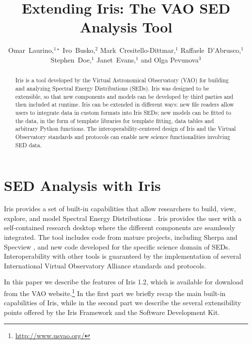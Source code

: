 \documentclass[11pt,twoside]{article}
\begin{document}
\title{Extending Iris: The VAO SED Analysis Tool}
\author{Omar~Laurino,$^{1\star}$ Ivo~Busko,$^2$ Mark~Cresitello-Dittmar,$^1$ Raffaele~D'Abrusco,$^1$ Stephen~Doe,$^1$ Janet~Evans,$^1$ and Olga Pevunova$^3$
}

\begin{abstract}
Iris is a tool developed by the Virtual Astronomical Observatory (VAO) for building and analyzing Spectral Energy Distributions (SEDs). Iris was designed to be extensible, so that new components and models can be developed by third parties and then included at runtime. Iris can be extended in different ways: new file readers allow users to integrate data in custom formats into Iris SEDs; new models can be fitted to the data, in the form of template libraries for template fitting, data tables and arbitrary Python functions. The interoperability-centered design of Iris and the Virtual Observatory standards and protocols can enable new science functionalities involving SED data.
\end{abstract}

\section{SED Analysis with Iris}
Iris provides a set of built-in capabilities that allow researchers to build, view, explore, and model Spectral Energy Distributions \citep[SEDs;][]{2012ASPC..461..893D}. Iris provides the user with a self-contained research desktop where the different components are seamlessly integrated. The tool includes code from mature projects, including Sherpa \citep{2007ASPC..376..543D} and Specview \citep{2000ASPC..216...79B}, and new code developed for the specific science domain of SEDs.
Interoperability with other tools is guaranteed by the implementation of several International Virtual Observatory Alliance standards and protocols.

In this paper we describe the features of Iris 1.2, which is available for download from the VAO website.\footnote{\url{http://www.usvao.org/}} In the first part we briefly recap the main built-in capabilities of Iris, while in the second part we describe the several extensibility points offered by the Iris Framework and the Software Development Kit.
\end{document}
